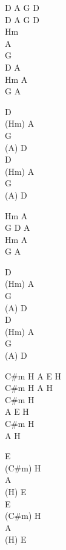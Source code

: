 \begin{chord}
D A G D\\
D A G D\\
Hm\\
A\\
G\\
D A\\
Hm A\\
G A

D\\
(Hm) A\\
G\\
(A) D\\
D\\
(Hm) A\\
G\\
(A) D

Hm A\\
G D A\\
Hm A\\
G A

D\\
(Hm) A\\
G\\
(A) D\\
D\\
(Hm) A\\
G\\
(A) D

C#m H A E H\\
C#m H A H\\
C#m H\\
A E H\\
C#m H\\
A H

E\\
(C#m) H\\
A\\
(H) E\\
E\\
(C#m) H\\
A\\
(H) E
\end{chord}
